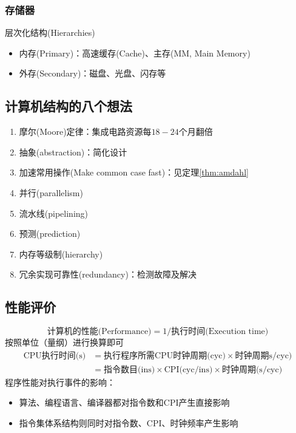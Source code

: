 \subsubsection{存储器}
层次化结构(Hierarchies)
\begin{itemize}
	\item 内存(Primary)：高速缓存(Cache)、主存(MM, Main Memory)
	\item 外存(Secondary)：磁盘、光盘、闪存等
\end{itemize}

\subsection{计算机结构的八个想法}
\begin{enumerate}
	\item 摩尔(Moore)定律：集成电路资源每$18-24$个月翻倍
	\item 抽象(abstraction)：简化设计
	\item 加速常用操作(Make common case fast)：见定理\ref{thm:amdahl}
	\item 并行(parallelism)
	\item 流水线(pipelining)
	\item 预测(prediction)
	\item 内存等级制(hierarchy)
	\item 冗余实现可靠性(redundancy)：检测故障及解决
\end{enumerate}

\subsection{性能评价}
\label{subsec:performance}
\[\text{计算机的性能(Performance)}=1/\text{执行时间(Execution time)}\]
按照单位（量纲）进行换算即可
\[\begin{aligned}
\text{CPU执行时间(s)}&=\text{执行程序所需CPU时钟周期(cyc)}\times\text{时钟周期s/cyc)}\\
&=\text{指令数目(ins)}\times\text{CPI(cyc/ins)}\times\text{时钟周期(s/cyc)}
\end{aligned}\]
程序性能对执行事件的影响：
\begin{itemize}
	\item 算法、编程语言、编译器都对指令数和CPI产生直接影响
	\item 指令集体系结构则同时对指令数、CPI、时钟频率产生影响
\end{itemize}